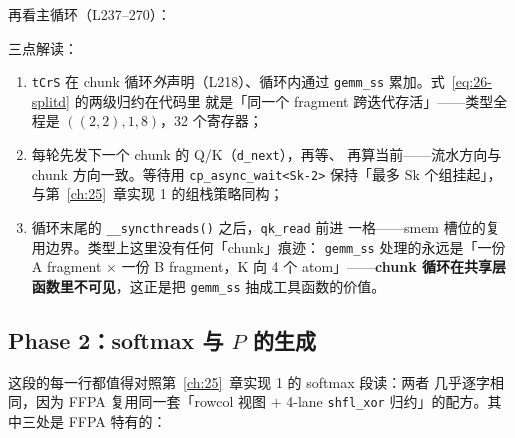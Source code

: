 再看主循环（L237--270）：



三点解读：

\begin{enumerate}[itemsep=2pt,topsep=2pt]
  \item \texttt{tCrS} 在 chunk 循环\emph{外}声明（L218）、循环内通过
        \texttt{gemm\_ss} 累加。式~\eqref{eq:26-splitd} 的两级归约在代码里
        就是「同一个 fragment 跨迭代存活」——类型全程是
        $((2,2),1,8)$，32 个寄存器；
  \item 每轮先发下一个 chunk 的 Q/K（\texttt{d\_next}），再等、
        再算当前——流水方向与 chunk 方向一致。等待用
        \texttt{cp\_\allowbreak{}async\_\allowbreak{}wait\allowbreak{}<Sk-2>} 保持「最多 $\mathrm{Sk}$ 个组挂起」，
        与第~\ref{ch:25}~章实现 1 的组栈策略同构；
  \item 循环末尾的 \texttt{\_\allowbreak{}\_\allowbreak{}syncthreads\allowbreak{}()} 之后，\texttt{qk\_read} 前进
        一格——smem 槽位的复用边界。类型上这里没有任何「chunk」痕迹：
        \texttt{gemm\_ss} 处理的永远是「一份 A fragment $\times$
        一份 B fragment，K 向 4 个 atom」——\textbf{chunk 循环在共享层
        函数里不可见}，这正是把 \texttt{gemm\_ss} 抽成工具函数的价值。
\end{enumerate}

\subsection{Phase 2：softmax 与 $P$ 的生成}



这段的每一行都值得对照第~\ref{ch:25}~章实现 1 的 softmax 段读：两者
几乎逐字相同，因为 FFPA 复用同一套「rowcol 视图 + 4-lane \texttt{shfl\_xor}
归约」的配方。其中三处是 FFPA 特有的：

